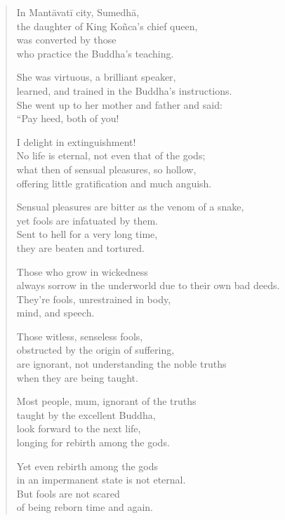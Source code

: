 \documentclass[12pt,openany]{book}%
\begin{document}
\begin{verse}%
In \textsanskrit{Mantāvatī} city, \textsanskrit{Sumedhā}, \\
the daughter of King \textsanskrit{Koñca}’s chief queen, \\
was converted by those \\
who practice the Buddha’s teaching. 

She was virtuous, a brilliant speaker, \\
learned, and trained in the Buddha’s instructions. \\
She went up to her mother and father and said: \\
“Pay heed, both of you! 

I delight in extinguishment! \\
No life is eternal, not even that of the gods; \\
what then of sensual pleasures, so hollow, \\
offering little gratification and much anguish. 

Sensual pleasures are bitter as the venom of a snake, \\
yet fools are infatuated by them. \\
Sent to hell for a very long time, \\
they are beaten and tortured. 

Those who grow in wickedness \\
always sorrow in the underworld due to their own bad deeds. \\
They’re fools, unrestrained in body, \\
mind, and speech. 

Those witless, senseless fools, \\
obstructed by the origin of suffering, \\
are ignorant, not understanding the noble truths \\
when they are being taught. 

Most people, mum, ignorant of the truths \\
taught by the excellent Buddha, \\
look forward to the next life, \\
longing for rebirth among the gods. 

Yet even rebirth among the gods \\
in an impermanent state is not eternal. \\
But fools are not scared \\
of being reborn time and again. 


\end{verse}
\end{document}
